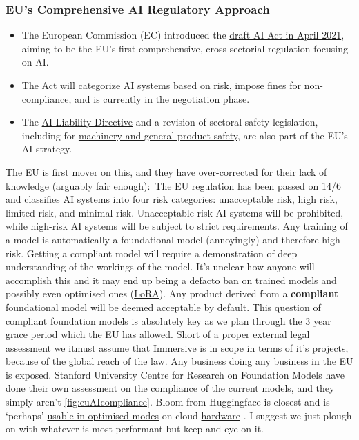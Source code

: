 \subsubsection{EU's Comprehensive AI Regulatory Approach}
\begin{itemize}
\item The European Commission (EC) introduced the \href{https://digital-strategy.ec.europa.eu/en/policies/regulatory-framework-ai}{draft AI Act in April 2021}, aiming to be the EU's first comprehensive, cross-sectorial regulation focusing on AI.
\item The Act will categorize AI systems based on risk, impose fines for non-compliance, and is currently in the negotiation phase.
\item The \href{https://commission.europa.eu/business-economy-euro/doing-business-eu/contract-rules/digital-contracts/liability-rules-artificial-intelligence_en}{AI Liability Directive} and a revision of sectoral safety legislation, including for \href{https://law.stanford.edu/publications/machine-learning-eu-data-sharing-practices/}{machinery and general product safety}, are also part of the EU's AI strategy.
\end{itemize}

The EU is first mover on this, and they have over-corrected for their lack of knowledge (arguably fair enough):\
The EU regulation has been passed on 14/6 and classifies AI systems into four risk categories: unacceptable risk, high risk, limited risk, and minimal risk. Unacceptable risk AI systems will be prohibited, while high-risk AI systems will be subject to strict requirements. Any training of a model is automatically a foundational model (annoyingly) and therefore high risk. Getting a compliant model will require a demonstration of deep understanding of the workings of the model. It's unclear how anyone will accomplish this and it may end up being a defacto ban on trained models and possibly even optimised ones (\hyperref[sec:LoRA]{LoRA}). Any product derived from a \textbf{compliant} foundational model will be deemed acceptable by default. This question of compliant foundation models is absolutely key as we plan through the 3 year grace period which the EU has allowed. Short of a proper external legal assessment we it{must} assume that Immersive is in scope in terms of it's projects, because of the global reach of the law. Any business doing any business in the EU is exposed. Stanford University Centre for Research on Foundation Models have done their own assessment on the compliance of the current models, and they simply aren't \ref{fig:euAIcompliance}. Bloom from Huggingface is closest and is `perhaps' \href{https://huggingface.co/BelleGroup/BELLE_BLOOM_GPTQ_4BIT}{usable in optimised modes} on cloud \href{https://lambdalabs.com/nvidia-h100-gpus}{hardware} \cite{dettmers2022case}. I suggest we just plough on with whatever is most performant but keep and eye on it.

